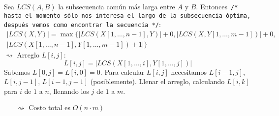 \documentclass[english, spanish, fleqn, 10pt]{article}
\newcommand{\comentarioc}[1]{\texttt{\textcolor{webred}{/* #1 */}}}
\numberwithin{equation}{section}
\newcommand{\nparentesis}[1]{\left( #1 \right)}
\newcommand{\nabsoluto}[1]{\left| #1 \right|}
\newcommand{\ncorchetes}[1]{\left[ #1 \right]}
\theoremstyle{definition}
\begin{document}
Sea $LCS\nparentesis{A, B}$ la subsecuencia común más larga entre $A$ y $B$. Entonces \comentarioc{hasta el momento sólo nos interesa el largo de la subsecuencia óptima, después vemos como encontrar la secuencia}:
\begin{align*}
\nabsoluto{LCS\nparentesis{X, Y}}=\max\{\nabsoluto{LCS\nparentesis{X\ncorchetes{1, \ldots, n-1}, Y}}+0, \nabsoluto{LCS\nparentesis{X, Y\ncorchetes{1, \ldots, m-1}}}+0,\\
 \nabsoluto{LCS\nparentesis{X\ncorchetes{1, \ldots, n-1}, Y\ncorchetes{1, \ldots, m-1}}+1}\}
\end{align*}
$\rightsquigarrow$ Arreglo $L\ncorchetes{i, j}$:
\begin{equation}
L\ncorchetes{i, j}=\nabsoluto{LCS\nparentesis{X\ncorchetes{1, \ldots, i}, Y\ncorchetes{1, \ldots, j}}}
\end{equation}
Sabemos $L\ncorchetes{0, j}=L\ncorchetes{i, 0}=0$. Para calcular $L\ncorchetes{i, j}$ necesitamos $L\ncorchetes{i-1, j}$, $L\ncorchetes{i, j-1}$, $L\ncorchetes{i-1, j-1}$ (posiblemente). Llenar el arreglo, calculando $L\ncorchetes{i, k}$ para $i$ de $1$ a $n$, llenando los $j$ de $1$ a $m$.
\begin{itemize}
	\item [$\rightsquigarrow$] Costo total es $O\nparentesis{n\cdot m}$
\end{itemize}
\end{document}
